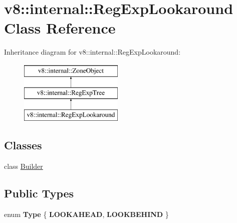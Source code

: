 \hypertarget{classv8_1_1internal_1_1RegExpLookaround}{}\section{v8\+:\+:internal\+:\+:Reg\+Exp\+Lookaround Class Reference}
\label{classv8_1_1internal_1_1RegExpLookaround}
Inheritance diagram for v8\+:\+:internal\+:\+:Reg\+Exp\+Lookaround\+:\begin{figure}[H]
\begin{center}
\leavevmode
\includegraphics[height=3.000000cm]{classv8_1_1internal_1_1RegExpLookaround}
\end{center}
\end{figure}
\subsection*{Classes}
\begin{DoxyCompactItemize}
\item 
class \mbox{\hyperlink{classv8_1_1internal_1_1RegExpLookaround_1_1Builder}{Builder}}
\end{DoxyCompactItemize}
\subsection*{Public Types}
\begin{DoxyCompactItemize}
\item 
\mbox{\label{classv8_1_1internal_1_1RegExpLookaround_a5982c9f5930a64e1547da44da96836db}} 
enum {\bfseries Type} \{ {\bfseries L\+O\+O\+K\+A\+H\+E\+AD}, 
{\bfseries L\+O\+O\+K\+B\+E\+H\+I\+ND}
 \}
\end{DoxyCompactItemize}
